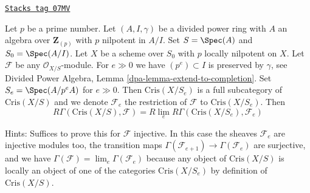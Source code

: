 \begin{remark}[Rlim]

\label{crystalline-remark-rlim}
\href{https://stacks.math.columbia.edu/tag/07MV}{\texttt{Stacks tag 07MV}}

Let $p$ be a prime number. Let $(A, I, \gamma)$ be a divided power
ring with $A$ an algebra over $\mathbf{Z}_{(p)}$ with $p$ nilpotent
in $A/I$. Set $S = \Spec(A)$ and $S_0 = \Spec(A/I)$.
Let $X$ be a scheme over $S_0$ with $p$ locally
nilpotent on $X$. Let $\mathcal{F}$ be any
$\mathcal{O}_{X/S}$-module. For $e \gg 0$ we have $(p^e) \subset I$
is preserved by $\gamma$, see
Divided Power Algebra, Lemma \ref{dpa-lemma-extend-to-completion}.
Set $S_e = \Spec(A/p^eA)$ for $e \gg 0$.
Then $\text{Cris}(X/S_e)$ is a full subcategory of $\text{Cris}(X/S)$
and we denote $\mathcal{F}_e$ the restriction of $\mathcal{F}$ to
$\text{Cris}(X/S_e)$. Then
$$
R\Gamma(\text{Cris}(X/S), \mathcal{F}) =
R\lim_e R\Gamma(\text{Cris}(X/S_e), \mathcal{F}_e)
$$

\medskip\noindent
Hints: Suffices to prove this for $\mathcal{F}$ injective.
In this case the sheaves $\mathcal{F}_e$ are injective
modules too, the transition maps
$\Gamma(\mathcal{F}_{e + 1}) \to \Gamma(\mathcal{F}_e)$ are
surjective, and we have
$\Gamma(\mathcal{F}) = \lim_e \Gamma(\mathcal{F}_e)$ because
any object of $\text{Cris}(X/S)$ is locally an object of one
of the categories $\text{Cris}(X/S_e)$ by definition of
$\text{Cris}(X/S)$.
\end{remark}

